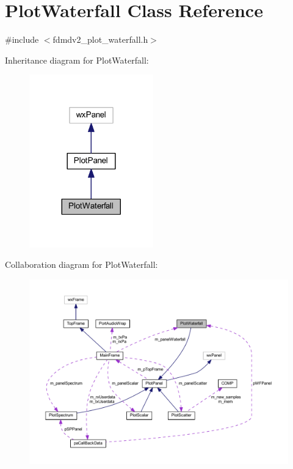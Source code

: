 \hypertarget{class_plot_waterfall}{\section{Plot\-Waterfall Class Reference}
\label{class_plot_waterfall}
}


{\ttfamily \#include $<$fdmdv2\-\_\-plot\-\_\-waterfall.\-h$>$}



Inheritance diagram for Plot\-Waterfall\-:\nopagebreak
\begin{figure}[H]
\begin{center}
\leavevmode
\includegraphics[width=152pt]{class_plot_waterfall__inherit__graph}
\end{center}
\end{figure}


Collaboration diagram for Plot\-Waterfall\-:
\nopagebreak
\begin{figure}[H]
\begin{center}
\leavevmode
\includegraphics[width=350pt]{class_plot_waterfall__coll__graph}
\end{center}
\end{figure}

